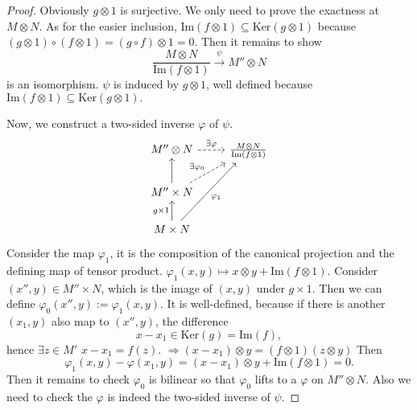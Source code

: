 \documentclass[11pt]{article}
\newcommand{\Lrta}{\Longrightarrow}
\newcommand{\lrta}{\longrightarrow}
\begin{document}
\begin{proof}
Obviously $g\otimes 1$ is surjective. We only need to prove the exactness at $M\otimes N$. As for the easier inclusion,
$
\text{Im}(f\otimes 1)\subseteq \text{Ker}(g\otimes 1)
$
because $(g\otimes 1)\circ (f\otimes 1)=(g\circ f)\otimes 1=0$. 
Then it remains to show 
$$
\frac{M\otimes N}{\text{Im}(f\otimes 1)}\overset{\psi}{\lrta}M''\otimes N
$$
is an isomorphism. $\psi $ is induced by $g\otimes 1$,  well defined because $
\text{Im}(f\otimes 1)\subseteq \text{Ker}(g\otimes 1).
$

Now, we construct a two-sided inverse $\varphi$ of $\psi$.
\[
\begin{tikzcd}
 M''\otimes N  \ar[r,dashed,"\exists \varphi"] & \frac{M\otimes N}{\text{Im}(f\otimes 1)} \\
 M''\times N \arrow[u] \arrow[ur,dashed,"\exists \varphi_0"]& \\
M\times N\arrow[swap,uur,"\varphi_1"]\arrow[u,"g\times 1"] &    
\end{tikzcd}
\] 
Consider the map $\varphi_1$, it is the composition of the canonical projection and the defining map of tensor product.
$\varphi_1(x,y)\mapsto x\otimes y+\text{Im}(f\otimes 1)$. Consider $(x'',y)\in M''\times N$, which is the image of $(x,y)$ under $g\times 1$. Then we can define $\varphi_0(x'',y):=\varphi_1(x,y)$. It is well-defined, because if there is another $(x_1,y)$ also map to $(x'',y)$, the difference
$$
x-x_1\in \text{Ker}(g)=\text{Im}(f),
$$
hence $\exists z\in M'$
$x-x_1=f(z)$.
$\Lrta (x-x_1)\otimes y=(f\otimes 1)(z\otimes y)$
Then
$$
\varphi_1(x,y)-\varphi(x_1,y)=(x-x_1)\otimes y+\text{Im}(f\otimes 1)=0.
$$
Then it remains to check $\varphi_0$ is bilinear so that $\varphi_0$ lifts to a $\varphi$ on $M''\otimes N$. Also we  need to check the $\varphi$ is indeed the two-sided inverse of $\psi$.


\end{proof}
\end{document}
